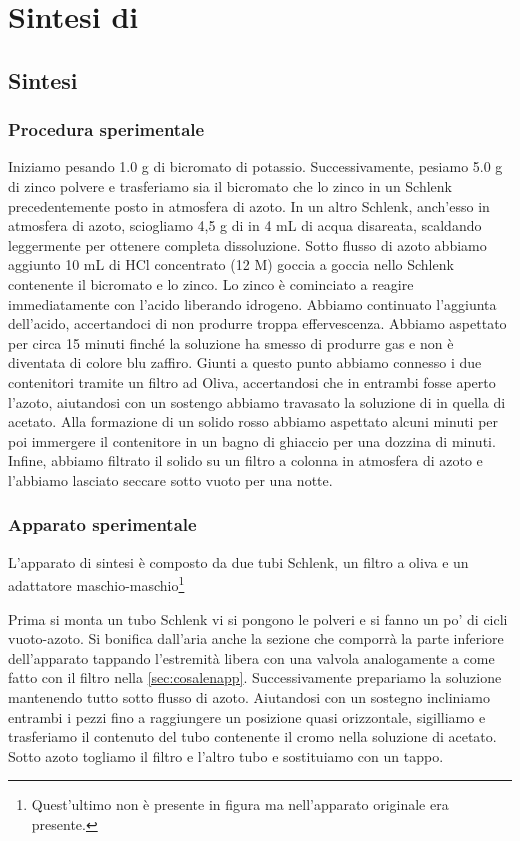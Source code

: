 \section{Sintesi di }
\subsection{Sintesi}
\subsubsection{Procedura sperimentale}

Iniziamo pesando 1.0 g di  bicromato di potassio. Successivamente, pesiamo 5.0 g di zinco polvere e trasferiamo sia il bicromato che lo zinco in un Schlenk precedentemente posto in atmosfera di azoto. In un altro Schlenk, anch'esso in atmosfera di azoto, sciogliamo 4,5 g di  in 4 mL di acqua disareata, scaldando leggermente per ottenere completa dissoluzione. Sotto flusso di azoto abbiamo aggiunto 10 mL di HCl concentrato (12 M) goccia a goccia  nello Schlenk contenente il bicromato e lo zinco.
Lo zinco è cominciato a reagire immediatamente con l’acido liberando idrogeno. Abbiamo continuato l’aggiunta dell’acido, accertandoci di non produrre troppa effervescenza. Abbiamo aspettato per circa 15 minuti finché la soluzione ha smesso di produrre gas e non è diventata di colore blu zaffiro. Giunti a questo punto abbiamo connesso i due contenitori tramite un filtro ad Oliva, accertandosi che in entrambi fosse aperto l'azoto, aiutandosi con un sostengo abbiamo travasato la soluzione di  in quella di acetato. Alla formazione di un solido rosso abbiamo aspettato alcuni minuti per poi immergere il contenitore in un bagno di ghiaccio per una dozzina di minuti.
Infine, abbiamo filtrato il solido su un filtro a colonna in atmosfera di azoto
e l'abbiamo lasciato seccare sotto vuoto per una notte.






\subsubsection{Apparato sperimentale}
L'apparato di sintesi è composto da due tubi Schlenk, un filtro a oliva e un adattatore maschio-maschio\footnote{Quest'ultimo non è presente in figura ma nell'apparato originale era presente.}

Prima si monta un tubo Schlenk vi si pongono le polveri e si fanno un po' di cicli vuoto-azoto. Si bonifica dall'aria anche la sezione che comporrà la parte inferiore dell'apparato tappando l'estremità libera con una valvola analogamente a come fatto con il filtro nella \autoref{sec:cosalenapp}. Successivamente prepariamo la soluzione mantenendo tutto sotto flusso di azoto. Aiutandosi con un sostegno incliniamo entrambi i pezzi fino a raggiungere un posizione quasi orizzontale, sigilliamo e trasferiamo il contenuto del tubo contenente il cromo nella soluzione di acetato. Sotto azoto togliamo il filtro e l'altro tubo e sostituiamo con un tappo. 

